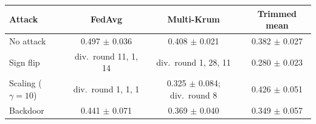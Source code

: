 \begin{tabular}{lccc}
\toprule
Attack & FedAvg & Multi-Krum & Trimmed mean \\
\midrule
No attack & 0.497 $\pm$ 0.036 & 0.408 $\pm$ 0.021 & 0.382 $\pm$ 0.027 \\
Sign flip & div.\ round 11, 1, 14 & div.\ round 1, 28, 11 & 0.280 $\pm$ 0.023 \\
Scaling ($\gamma=10$) & div.\ round 1, 1, 1 & 0.325 $\pm$ 0.084; div.\ round 8 & 0.426 $\pm$ 0.051 \\
Backdoor & 0.441 $\pm$ 0.071 & 0.369 $\pm$ 0.040 & 0.349 $\pm$ 0.057 \\
\bottomrule
\end{tabular}
